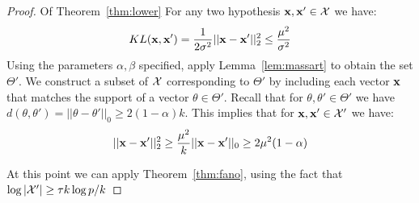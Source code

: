 \begin{proof}{Of Theorem~\ref{thm:lower}}
For any two hypothesis $\mathbf{x}, \mathbf{x}' \in \mathcal{X}$ we have:
\[
KL(\mathbf{x}, \mathbf{x}') = \frac{1}{2\sigma^2} ||\mathbf{x} - \mathbf{x}'||_2^2 \le \frac{\mu^2}{\sigma^2}
\]
Using the parameters $\alpha, \beta$ specified, apply Lemma~\ref{lem:massart} to obtain the set $\Theta'$.
We construct a subset of $\mathcal{X}$ corresponding to $\Theta'$ by including each vector $\mathbf{x}$ that matches the support of a vector $\theta \in \Theta'$.
Recall that for $\theta, \theta' \in \Theta'$ we have $d(\theta, \theta') = ||\theta - \theta'||_0 \ge 2 (1-\alpha) k$.
This implies that for $\mathbf{x}, \mathbf{x}' \in \mathcal{X}'$ we have:
\[
||\mathbf{x} - \mathbf{x}'||_2^2 \ge \frac{\mu^2}{k} ||\mathbf{x} - \mathbf{x}'||_0 \ge 2\mu^2(1-\alpha)
\]

At this point we can apply Theorem~\ref{thm:fano}, using the fact that $\log |\mathcal{X}'| \ge \tau k \log p/k$ 
\end{proof}
